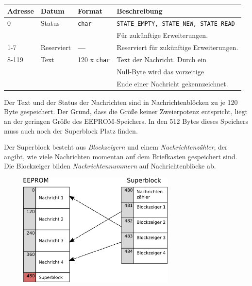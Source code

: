 \documentclass[ngerman]{article}
\begin{document}
\begin{tabular}{|l|l|l|l|}
    \hline
    {\bf Adresse} & {\bf Datum} & {\bf Format} & {\bf Beschreibung} \\
    \hline
    \hline
    0 & Status & {\tt char} & {\tt STATE\_EMPTY, STATE\_NEW,  STATE\_READ} \\
                          &&& Für zukünftige Erweiterungen. \\
    \hline
    1-7 & Reserviert & {\bf --- }  & Reserviert für zukünftige Erweiterungen. \\
    \hline
    8-119 & Text & 120 x {\tt char} & Text der Nachricht. Durch ein \\
                                  &&& Null-Byte wird das vorzeitige \\
                                  &&& Ende einer Nachricht gekennzeichnet. \\
    \hline
\end{tabular}

Der Text und der Status der Nachrichten sind in
Nachrichtenblöcken zu je 120 Byte gespeichert. Der Grund, dass die
Größe keiner Zweierpotenz entspricht, liegt an der geringen Größe
des EEPROM-Speichers. In den 512 Bytes dieses Speichers muss auch
noch der Superblock Platz finden.

Der Superblock besteht aus \textit{Blockzeigern} und einem \textit{Nachrichtenzähler},
der angibt, wie viele Nachrichten momentan auf dem Briefkasten
gespeichert sind. Die Blockzeiger bilden \textit{Nachrichtennummern}
auf Nachrichtenblöcke ab.

\begin{figure}[h!] \begin{center}
    \includegraphics[width=0.7\textwidth]{media/eeprom}
\end{center} \end{figure}
\end{document}
